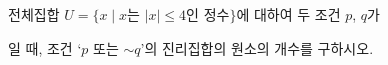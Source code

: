 전체집합 $U=\{x \mid x$는 $|x|\le 4$인 정수$\}$에 대하여 두 조건 $p$, $q$가 \par\smallskip{}\par\smallskip\noindent 일 때, 조건 ‘$p$ 또는 $\sim q$’의 진리집합의 원소의 개수를 구하시오.
